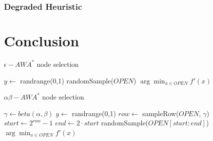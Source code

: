 \documentclass{llncs}
\begin{document}
\subsubsection{Degraded Heuristic}


\section{Conclusion}


\begin{algorithm}
\caption{$\epsilon-AWA^*$ node selection}\label{alg:eawa}
\begin{algorithmic}
\State $y \gets $ randrange(0,1)
    \State\Return randomSample($OPEN$)
\Else{}
    \State\Return $\arg \min_{x \in OPEN} f'(x)$
\EndIf
\end{algorithmic}
\end{algorithm}


\begin{algorithm}
\caption{$\alpha \beta-AWA^*$ node selection}\label{alg:abawa}
\begin{algorithmic}
\Require $\gamma \gets beta(\alpha, \beta)$
\State $y \gets $ randrange(0,1)
    \State $row \gets $ sampleRow($OPEN$, $\gamma$)
    \State $start \gets 2^{row}-1$
    \State $end \gets 2 \cdot start$
    \State \Return randomSample($OPEN[start:end]$)
\Else{}
    \State \Return $\arg \min_{x \in OPEN} f'(x)$
\EndIf
\end{algorithmic}
\end{algorithm}


\newpage


\end{document}
